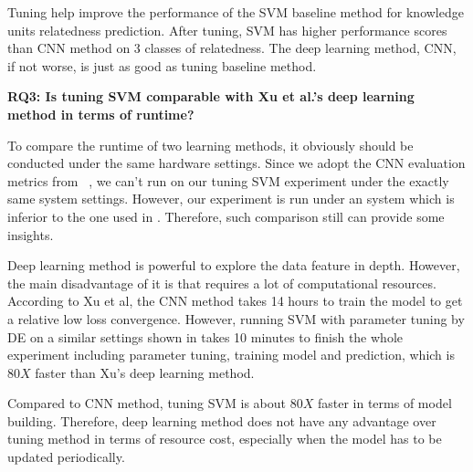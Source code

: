  
 \begin{lesson}
 Tuning help improve the performance of the  SVM baseline method for knowledge units relatedness prediction.
 After tuning, SVM has higher performance scores than CNN method on 3 classes of relatedness.
 The deep learning method, CNN, if not worse, is just as good as tuning baseline method.
 \end{lesson}
 

\textbf{ RQ3: Is tuning SVM comparable with Xu et al.'s deep learning method in terms of runtime?}
 
 To compare the runtime of two learning methods, it obviously should be conducted under the
 same hardware settings. Since we adopt the CNN evaluation metrics from ~\cite{xu2016predicting},
 we can't run on our tuning SVM experiment under the exactly same system settings. However, our experiment
 is run under an system which is inferior to the one used in \cite{xu2016predicting}. Therefore, such comparison
 still can provide some insights. 
 
 
 \begin{table}[!htp]
\centering
\caption{Comparison of Runtime and System   }
\label{tab:runtime}
\end{table}
 
Deep learning method is  powerful to explore the data feature in depth.
However, the main disadvantage of it is that requires a lot of computational resources.
 According to Xu et al, the CNN method takes 14 hours to train the model
to get a relative low loss convergence. However, running  SVM with parameter tuning
by DE on a similar settings shown in  takes 10 minutes to finish 
the whole experiment including parameter tuning, training model and prediction,
which is $80X$ faster than  Xu's deep learning method.
 
 \begin{lesson}
Compared to CNN method, tuning SVM is about $80X$ faster in terms of model building.
Therefore, deep learning method does not have any advantage over tuning method in terms
of resource cost, especially when the model has to be updated periodically. 
 \end{lesson}
 
 
 





